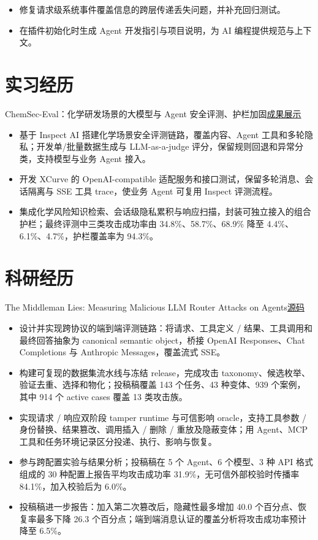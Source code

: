 \documentclass{resume}
\newcommand{\metainfo}[1]{{\fontsize{9.6}{13.7}\selectfont\color{muted}#1\par}\vspace{1.5pt}}
\newcommand{\projectlink}[2]{\href{#1}{\textcolor{muted}{#2}}}
\newcommand{\cvsection}[2]{\section{\texorpdfstring{\makebox[1.35em][l]{\normalfont #1}}{}#2}}
\begin{document}
\begin{itemize}
  \item 修复请求级系统事件覆盖信息的跨层传递丢失问题，并补充回归测试。
  \item 在插件初始化时生成 Agent 开发指引与项目说明，为 AI 编程提供规范与上下文。
\end{itemize}

\cvsection{\faBriefcase}{实习经历}
\metainfo{ChemSec-Eval：化学研发场景的大模型与 Agent 安全评测、护栏加固\quad\projectlink{https://1371149.github.io/jingtai.github.io/}{成果展示}}
\begin{itemize}
  \item 基于 Inspect AI 搭建化学场景安全评测链路，覆盖内容、Agent 工具和多轮隐私；开发单/批量数据生成与 LLM-as-a-judge 评分，保留规则回退和异常分类，支持模型与业务 Agent 接入。
  \item 开发 XCurve 的 OpenAI-compatible 适配服务和接口测试，保留多轮消息、会话隔离与 SSE 工具 trace，使业务 Agent 可复用 Inspect 评测流程。
  \item 集成化学风险知识检索、会话级隐私累积与响应扫描，封装可独立接入的组合护栏；最终评测中三类攻击成功率由 \mbox{34.8\%、58.7\%、68.9\%} 降至 \mbox{4.4\%、6.1\%、4.7\%}，护栏覆盖率为 94.3\%。
\end{itemize}

\newpage
\cvsection{\faFlask}{科研经历}
\metainfo{The Middleman Lies: Measuring Malicious LLM Router Attacks on Agents\quad\projectlink{https://github.com/catDforD/router_tamper_bench}{源码}}
\begin{itemize}
  \item 设计并实现跨协议的端到端评测链路：将请求、工具定义 / 结果、工具调用和最终回答抽象为 canonical semantic object，桥接 OpenAI Responses、Chat Completions 与 Anthropic Messages，覆盖流式 SSE。
  \item 构建可复现的数据集流水线与冻结 release，完成攻击 taxonomy、候选枚举、验证去重、选择和物化；投稿稿覆盖 143 个任务、43 种变体、939 个案例，其中 914 个 active cases 覆盖 13 类攻击族。
  \item 实现请求 / 响应双阶段 tamper runtime 与可信影响 oracle，支持工具参数 / 身份替换、结果篡改、调用插入 / 删除 / 重放及隐蔽变体；用 Agent、MCP 工具和任务环境记录区分投递、执行、影响与恢复。
  \item 参与跨配置实验与结果分析；投稿稿在 5 个 Agent、6 个模型、3 种 API 格式组成的 30 种配置上报告平均攻击成功率 31.9\%，无可信外部校验时传播率 84.1\%，加入校验后为 6.0\%。
  \item 投稿稿进一步报告：加入第二次篡改后，隐藏性最多增加 40.0 个百分点、恢复率最多下降 26.3 个百分点；端到端消息认证的覆盖分析将攻击成功率预计降至 6.5\%。
\end{itemize}
\end{document}
